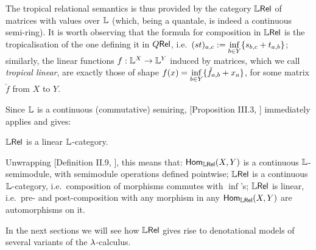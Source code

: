 The tropical relational semantics is thus provided by the category $\mathbb{L} \mathsf{Rel}$ of matrices with values over $\mathbb{L}$ (which, being a quantale, is indeed a continuous semi-ring).
It is worth observing that the formula for composition in $\mathbb{L} \mathsf{Rel}$ is the tropicalisation of the one defining it in $Q \mathsf{Rel}$, i.e.\ $(st)_{a,c}:=\inf\limits_{b\in Y}\{s_{b,c}+t_{a,b}\}$;
 similarly, the linear functions $f:\mathbb{L}^X\to \mathbb{L}^Y$ induced by matrices, which we call \emph{tropical linear}, are exactly those of shape $f(x)=\inf\limits_{b\in Y} \{\check f_{a,b}+x_a\}$, for some matrix $\check f$ from $X$ to $Y$.

Since $\mathbb{L}$ is a continuous (commutative) semiring, [Proposition III.3, \cite{Manzo2013}] immediately applies and gives:

\begin{fact}
 $\mathbb{L} \mathsf{Rel}$ is a linear $\mathbb{L}$-category.
\end{fact}

Unwrapping [Definition II.9, \cite{Manzo2013}], this means that:
$\mathsf{Hom}_{\mathbb{L} \mathsf{Rel}}(X,Y)$ is a continuous $\mathbb{L}$-semimodule, with semimodule operations defined pointwise;
$\mathbb{L} \mathsf{Rel}$ is a continuous $\mathbb{L}$-category, i.e.\ composition of morphisms commutes with $\inf$'s;
$\mathbb{L} \mathsf{Rel}$ is linear, i.e.\ pre- and post-composition with any morphism in any $\mathsf{Hom}_{\mathbb{L} \mathsf{Rel}}(X,Y)$ are automorphisms on it.

In the next sections we will see how $\mathbb{L} \mathsf{Rel}$ gives rise to denotational models of several variants of the $\lambda$-calculus.
